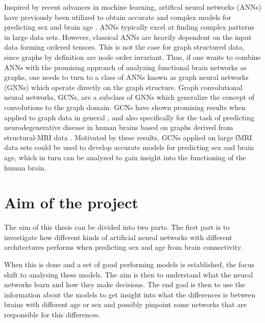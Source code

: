 

Inspired by recent advances in machine learning, artifical neural networks (ANNs) have previously been utilized to obtain accurate and complex models for predicting sex and brain age \cite{multiplex}\cite{stankeviciute}\cite{arslan}. ANNs typically excel at finding complex patterns in large data sets. However, classical ANNs are heavily dependent on the input data forming ordered tensors. This is not the case for graph structured data, since graphs by definition are node order invariant. Thus, if one wants to combine ANNs with the promising approach of analyzing functional brain networks as graphs, one needs to turn to a class of ANNs known as graph neural networks (GNNs) which operate directly on the graph structure. Graph convolutional neural networks, GCNs, are a subclass of GNNs which generalize the concept of convolutions to the graph domain. GCNs have shown promising results when applied to graph data in general \cite{kipf_semi_supervised}\cite{kipf_vae}\cite{wu_review}, and also specifically for the task of predicting neurodegenerative disease in human brains based on graphs derived from structural-MRI data \cite{jansson_sandstrom}. Motivated by these results, GCNs applied on large fMRI data sets could be used to develop accurate models for predicting sex and brain age, which in turn can be analyzed to gain insight into the functioning of the human brain.


\section{Aim of the project}
The aim of this thesis can be divided into two parts. The first part is to investigate how different kinds of artificial neural networks with different architectures performs when predicting sex and age from brain connectivity.

When this is done and a set of good performing models is established, the focus shift to analysing these models. The aim is then to understand what the neural networks learn and how they make decisions. The end goal is then to use the information about the models to get insight into what the differences is between brains with different age or sex and possibly pinpoint some networks that are responsible for this differences. 


